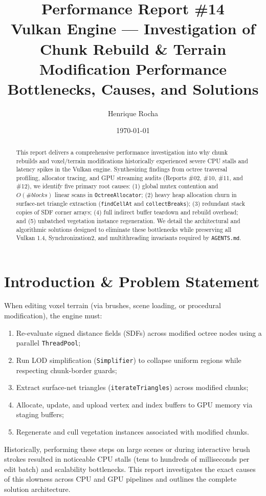 \documentclass[a4paper,12pt]{article}
\title{\textbf{Performance Report \#14}\\[4pt]
\large Vulkan Engine — Investigation of Chunk Rebuild \& Terrain\\Modification Performance Bottlenecks, Causes, and Solutions}
\author{Henrique Rocha}
\date{\today}
\begin{document}
\maketitle

\begin{abstract}
This report delivers a comprehensive performance investigation into why chunk rebuilds and voxel/terrain modifications historically experienced severe CPU stalls and latency spikes in the Vulkan engine. Synthesizing findings from octree traversal profiling, allocator tracing, and GPU streaming audits (Reports \#02, \#10, \#11, and \#12), we identify five primary root causes: (1) global mutex contention and $O(\#blocks)$ linear scans in \texttt{OctreeAllocator}; (2) heavy heap allocation churn in surface-net triangle extraction (\texttt{findCellAt} and \texttt{collectBreaks}); (3) redundant stack copies of SDF corner arrays; (4) full indirect buffer teardown and rebuild overhead; and (5) unbatched vegetation instance regeneration. We detail the architectural and algorithmic solutions designed to eliminate these bottlenecks while preserving all Vulkan 1.4, Synchronization2, and multithreading invariants required by \texttt{AGENTS.md}.
\end{abstract}

\tableofcontents
\newpage

\section{Introduction \& Problem Statement}

When editing voxel terrain (via brushes, scene loading, or procedural modification), the engine must:
\begin{enumerate}
  \item Re-evaluate signed distance fields (SDFs) across modified octree nodes using a parallel \texttt{ThreadPool};
  \item Run LOD simplification (\texttt{Simplifier}) to collapse uniform regions while respecting chunk-border guards;
  \item Extract surface-net triangles (\texttt{iterateTriangles}) across modified chunks;
  \item Allocate, update, and upload vertex and index buffers to GPU memory via staging buffers;
  \item Regenerate and cull vegetation instances associated with modified chunks.
\end{enumerate}

Historically, performing these steps on large scenes or during interactive brush strokes resulted in noticeable CPU stalls (tens to hundreds of milliseconds per edit batch) and scalability bottlenecks. This report investigates the exact causes of this slowness across CPU and GPU pipelines and outlines the complete solution architecture.
\end{document}
